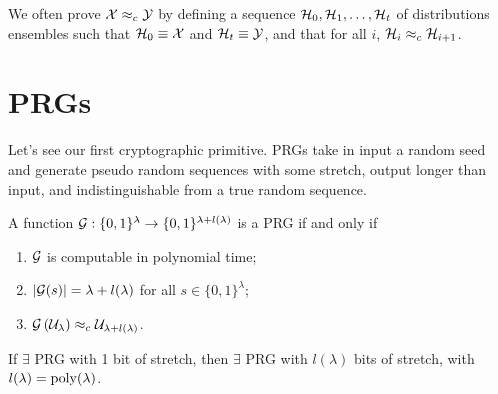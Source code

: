 We often prove $\mathcal{X} \approx_c \mathcal{Y}$ by defining a sequence $\mathcal{H}_0, \mathcal{H}_1, \dots, \mathcal{H}_t$ of distributions ensembles such that $\mathcal{H}_0 \equiv \mathcal{X}$ and $\mathcal{H}_t \equiv \mathcal{Y}$, and that for all $i$, $\mathcal{H}_i \approx_c \mathcal{H}_{i+1}$.

\section{\aclp{PRG}}

Let's see our first cryptographic primitive.
\acp{PRG} take in input a random seed and generate pseudo random sequences with some stretch, \ie output longer than input, and indistinguishable from a true random sequence.

\begin{definition}
	A function $\mathcal{G} : \{0,1\}^{\lambda} \to \{0,1\}^{\lambda + l(\lambda)}$ is a \ac{PRG} if and only if
	\begin{enumerate}
		\item $\mathcal{G}$ is computable in polynomial time;
		\item $\left|{\mathcal{G}(s)}\right| = \lambda + l(\lambda)$ for all $s \in \{0,1\}^{\lambda}$;
		\item $\mathcal{G} \left( \mathcal{U}_{\lambda} \right) \approx_c \mathcal{U}_{\lambda + l(\lambda)}$.
	\end{enumerate}
\end{definition}

\begin{theorem} \label{thm:prg-any-stretch}
	If $\exists$ \ac{PRG} with 1 bit of stretch, then $\exists$ \ac{PRG} with $l(\lambda)$ bits of stretch, with $l(\lambda) = \mathrm{poly}(\lambda)$.
\end{theorem}


